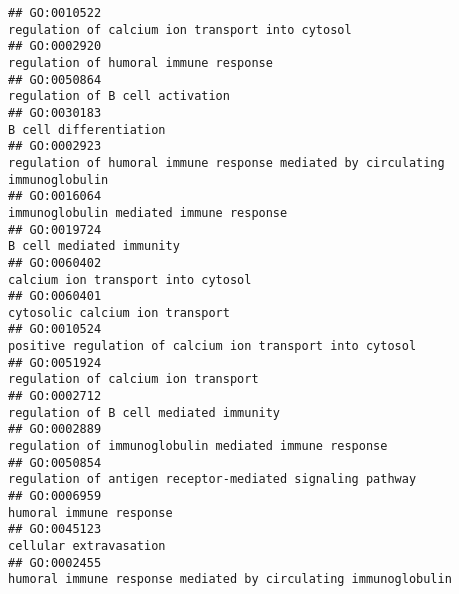 \documentclass[
]{article}
\begin{document}
\begin{verbatim}
## GO:0010522                                                                                                 regulation of calcium ion transport into cytosol
## GO:0002920                                                                                                            regulation of humoral immune response
## GO:0050864                                                                                                                  regulation of B cell activation
## GO:0030183                                                                                                                           B cell differentiation
## GO:0002923                                                                     regulation of humoral immune response mediated by circulating immunoglobulin
## GO:0016064                                                                                                          immunoglobulin mediated immune response
## GO:0019724                                                                                                                         B cell mediated immunity
## GO:0060402                                                                                                               calcium ion transport into cytosol
## GO:0060401                                                                                                                  cytosolic calcium ion transport
## GO:0010524                                                                                        positive regulation of calcium ion transport into cytosol
## GO:0051924                                                                                                              regulation of calcium ion transport
## GO:0002712                                                                                                           regulation of B cell mediated immunity
## GO:0002889                                                                                            regulation of immunoglobulin mediated immune response
## GO:0050854                                                                                        regulation of antigen receptor-mediated signaling pathway
## GO:0006959                                                                                                                          humoral immune response
## GO:0045123                                                                                                                           cellular extravasation
## GO:0002455                                                                                   humoral immune response mediated by circulating immunoglobulin

\end{verbatim}
\end{document}
